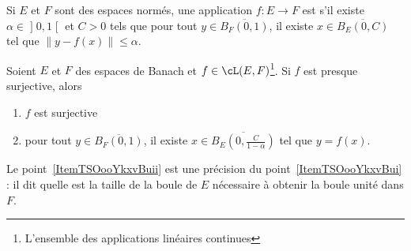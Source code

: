 \begin{definition}
Si \( E\) et \( F\) sont des espaces normés, une application \( f\colon E\to F\) est  s'il existe \( \alpha\in\mathopen] 0 , 1 \mathclose[\) et \( C>0\) tels que pour tout \( y\in \overline{ B_F(0,1) }\), il existe \( x\in\overline{ B_E(0,C) }\) tel que \( \| y-f(x) \|\leq \alpha\).
\end{definition}

\begin{lemma}   \label{LemBQLooRXhJzK}
    Soient \( E\) et \( F\) des espaces de Banach et \( f\in\cL(E,F)\)\footnote{L'ensemble des applications linéaires continues}. Si \( f\) est presque surjective, alors
    \begin{enumerate}
        \item   \label{ItemTSOooYkxvBui}
            \( f\) est surjective
        \item\label{ItemTSOooYkxvBuii}
            pour tout \( y\in \overline{ B_F(0,1) }\), il existe \( x\in\overline{ B_E(0,\frac{ C }{ 1-\alpha }) }\) tel que \( y=f(x)\).
    \end{enumerate}
\end{lemma}
Le point~\ref{ItemTSOooYkxvBuii} est une précision du point~\ref{ItemTSOooYkxvBui} : il dit quelle est la taille de la boule de \( E\) nécessaire à obtenir la boule unité dans \( F\).

